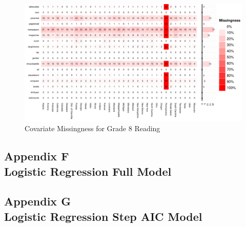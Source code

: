 \documentclass[letterpaper,12p,twoside]{article} %
\begin{document}
\begin{figure}[h]
\begin{center}
\includegraphics[width=\textwidth]{../Figures/g8readingmissing.pdf}
\caption{Covariate Missingness for Grade 8 Reading}
\label{fig:g8reading:missing}
\end{center}
\end{figure}


\cleardoublepage
{}
\subsection*{Appendix F\\Logistic Regression Full Model}
\label{appendixlogistic}
\begin{singlespace}
 \clearpage
 \clearpage
 \clearpage
 \clearpage
 \clearpage
 \clearpage
 \clearpage
 \clearpage
\end{singlespace}

\cleardoublepage
{}
\subsection*{Appendix G\\Logistic Regression Step AIC Model}
\label{appendixlogisticaic}
\begin{singlespace}
 \clearpage
 \clearpage
 \clearpage
 \clearpage
 \clearpage
 \clearpage
 \clearpage
 \clearpage
\end{singlespace}
\end{document}
